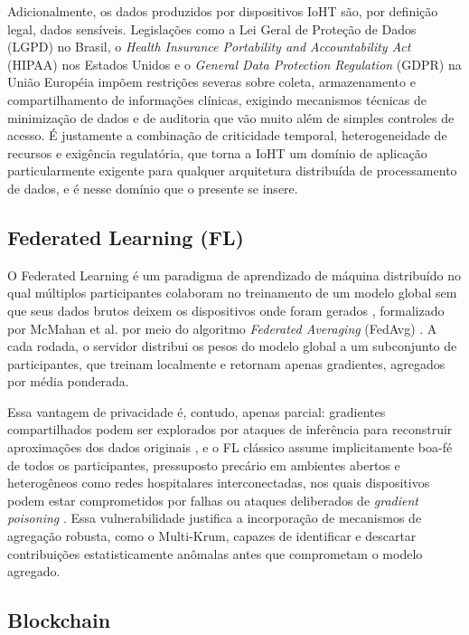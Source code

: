 \documentclass[12pt]{article}
\begin{document}
Adicionalmente, os dados produzidos por dispositivos IoHT são, por definição legal, dados sensíveis. Legislações como a Lei Geral de Proteção de Dados (LGPD) no Brasil, o \textit{Health Insurance Portability and Accountability Act} (HIPAA) nos Estados Unidos e o \textit{General Data Protection Regulation} (GDPR) na União Européia impõem restrições severas sobre coleta, armazenamento e compartilhamento de informações clínicas, exigindo mecanismos técnicas de minimização de dados e de auditoria que vão muito além de simples controles de acesso. É justamente a combinação de criticidade temporal, heterogeneidade de recursos e exigência regulatória, que torna a IoHT um domínio de aplicação particularmente exigente para qualquer arquitetura distribuída de processamento de dados, e é nesse domínio que o presente se insere.

\subsection{Federated Learning (FL)}

O Federated Learning é um paradigma de aprendizado de máquina distribuído no qual múltiplos participantes colaboram no treinamento de um modelo global sem que seus dados brutos deixem os dispositivos onde foram gerados \cite{nguyen2022federated}, formalizado por McMahan et al. por meio do algoritmo \textit{Federated Averaging} (FedAvg) \cite{mcmahan2017communication}. A cada rodada, o servidor distribui os pesos do modelo global a um subconjunto de participantes, que treinam localmente e retornam apenas gradientes, agregados por média ponderada.

Essa vantagem de privacidade é, contudo, apenas parcial: gradientes compartilhados podem ser explorados por ataques de inferência para reconstruir aproximações dos dados originais \cite{pfitzner2023flhealthcare}, e o FL clássico assume implicitamente boa-fé de todos os participantes, pressuposto precário em ambientes abertos e heterogêneos como redes hospitalares interconectadas, nos quais dispositivos podem estar comprometidos por falhas ou ataques deliberados de \textit{gradient poisoning} \cite{blanchard2017machine}. Essa vulnerabilidade justifica a incorporação de mecanismos de agregação robusta, como o Multi-Krum, capazes de identificar e descartar contribuições estatisticamente anômalas antes que comprometam o modelo agregado.

\subsection{Blockchain}
\end{document}
